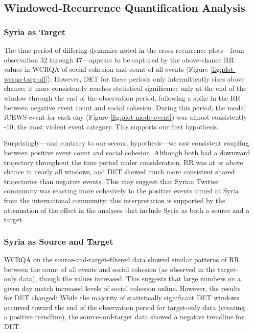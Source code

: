 \documentclass[
  english,
  man]{apa6}
\begin{document}
\hypertarget{windowed-recurrence-quantification-analysis}{%
\subsection{Windowed-Recurrence Quantification Analysis}\label{windowed-recurrence-quantification-analysis}}

\hypertarget{syria-as-target-3}{%
\subsubsection{Syria as Target}\label{syria-as-target-3}}

The time period of differing dynamics noted in the cross-recurrence plots---from
observation 32 through 47---appears to be captured by the above-chance RR values
in WCRQA of social cohesion and count of all events (Figure
\ref{fig:plot-wcrqa-targ-all}). However, DET for these periods only
intermittently rises above chance; it more consistently reaches statistical
significance only at the end of the window through the end of the observation
period, following a spike in the RR between negative event count and social
cohesion. During this period, the modal ICEWS event for each day (Figure
\ref{fig:plot-mode-event}) was almost consistently -10, the most violent event
category. This supports our first hypothesis.

Surprisingly---and contrary to our second hypothesis---we saw consistent
coupling between positive event count and social cohesion. Although both had a
downward trajectory throughout the time period under consideration, RR was at or
above chance in nearly all windows, and DET showed much more consistent shared
trajectories than negative events. This may suggest that Syrian Twitter
community was reacting more cohesively to the positive events aimed at Syria
from the international community; this interpretation is supported by the
attenuation of the effect in the analyses that include Syria as both a source
and a target.

\hypertarget{syria-as-source-and-target-3}{%
\subsubsection{Syria as Source and Target}\label{syria-as-source-and-target-3}}

WCRQA on the source-and-target-filtered data showed similar patterns of RR
between the count of all events and social cohesion (as observed in the
target-only data), though the values increased. This suggests that large numbers
on a given day match increased levels of social cohesion online. However, the
results for DET changed: While the majority of statistically significant DET
windows occurred toward the end of the observation period for target-only data
(creating a positive trendline), the source-and-target data showed a negative
trendline for DET.
\end{document}
